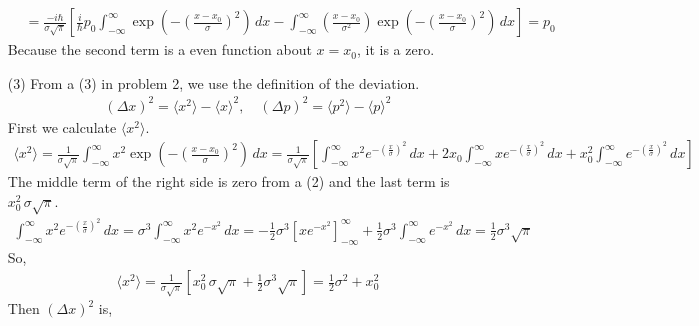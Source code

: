 \documentclass[aps,floatfix,nofootinbib,superscriptaddress,fleqn]{revtex4}
\begin{document}
\begin{itemize}
\begin{align}
              \\    &= \frac{-i\hbar}{\sigma\sqrt{\pi}}\left[ \frac{i}{\hbar}p_0\int_{-\infty}^{\infty}\exp\left( -{\left(\frac{x-x_0}{\sigma}\right)}^2 \right)\,dx -\int_{-\infty}^{\infty}\left( \frac{x-x_0}{\sigma^2}\right)\exp\left( -{\left(\frac{x-x_0}{\sigma}\right)}^2 \right)\,dx\right] 
                     = p_0    
\end{align}
Because the second term is a even function about $x=x_0$, it is a zero.
    \item[(3)] From a (3) in problem 2, we use the definition of the deviation.
    \begin{align}
      {(\Delta x)}^2 = \langle x^2\rangle - \langle x\rangle^2 ,\quad {(\Delta p)}^2 = \langle p^2\rangle - \langle p\rangle^2 
    \end{align}
    First we calculate $\langle x^2\rangle$.
    \begin{align}
      \langle x^2\rangle = \frac{1}{\sigma\sqrt{\pi}}\int_{-\infty}^{\infty} x^2 \exp\left(-{\left( \frac{x-x_0}{\sigma} \right)}^2\right)\,dx
                        = \frac{1}{\sigma\sqrt{\pi}}\left[\int_{-\infty}^{\infty} x^2 e^{-{\left( \frac{x}{\sigma} \right)}^2}\,dx
                                                        +2x_0\int_{-\infty}^{\infty} xe^{-{\left( \frac{x}{\sigma} \right)}^2}\,dx
                                                        +x^2_0\int_{-\infty}^{\infty} e^{-{\left( \frac{x}{\sigma} \right)}^2}\,dx\right]
    \end{align}
    The middle term of the right side is zero from a (2) and the last term is $x^2_0\,\sigma\sqrt{\pi}$.
    \begin{align}
      \int_{-\infty}^{\infty} x^2 e^{-{\left( \frac{x}{\sigma} \right)}^2}\,dx = \sigma^3\int_{-\infty}^{\infty} x^2 e^{-x^2}\,dx 
                                                            = -\frac{1}{2}\sigma^3{\left[xe^{-x^2}\right]}^{\infty}_{-\infty}
                                                              +\frac{1}{2}\sigma^3\int_{-\infty}^{\infty} e^{-x^2}\,dx
                                                            = \frac{1}{2}\sigma^3\sqrt{\pi}
    \end{align}
    So,
    \begin{align}
      \langle x^2 \rangle = \frac{1}{\sigma\sqrt{\pi}}\left[ x^2_0\,\sigma\sqrt{\pi}
                            + \frac{1}{2}\sigma^3\sqrt{\pi} \right]
                          = \frac{1}{2}\sigma^2+x_0^2
    \end{align}
    Then $\left(\Delta x\right)^2$ is,

\end{itemize}
\end{document}
